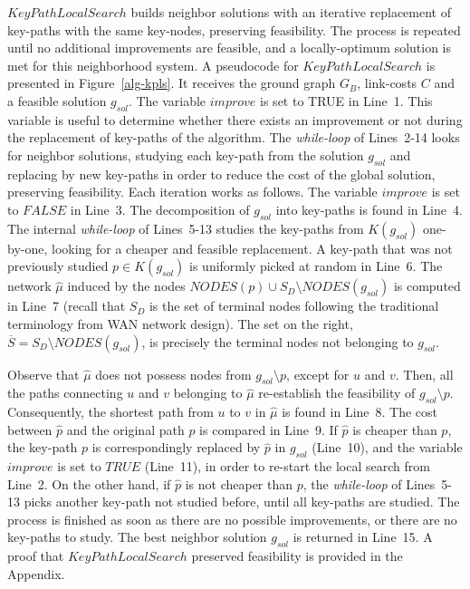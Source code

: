$KeyPathLocalSearch$ builds neighbor solutions with an iterative replacement of key-paths with 
the same key-nodes, preserving feasibility. The process is repeated until no additional improvements are feasible, and a locally-optimum solution is met for this neighborhood system. 
A pseudocode for $KeyPathLocalSearch$ is presented in Figure~\ref{alg-kpls}. 
It receives the ground graph $G_B$, link-costs $C$ and a feasible solution $g_{sol}$. 
The variable $improve$ is set to TRUE in Line~1. This variable is useful to determine whether there exists 
an improvement or not during the replacement of key-paths of the algorithm. The \textit{while-loop} 
of Lines~2-14 looks for neighbor solutions, studying each key-path from the solution $g_{sol}$ and 
replacing by new key-paths in order to reduce the cost of the global solution, preserving feasibility. 
Each iteration works as follows. The variable $improve$ is set to $FALSE$ in Line~3. The decomposition of $g_{sol}$ 
into key-paths is found in Line~4. The internal \textit{while-loop} of Lines~5-13 studies the key-paths from 
$K(g_{sol})$ one-by-one, looking for a cheaper and feasible replacement. A key-path that 
was not previously studied $p\in K (g_{sol})$ is uniformly picked at random in Line~6. 
The network $\hat{\mu}$ induced by the nodes $NODES(p) \cup S_D\setminus NODES(g_{sol})$ 
is computed in Line~7 (recall that $S_D$ is the set of terminal nodes following the traditional terminology from WAN network design). The set on the right, $\overline{S}=S_D\setminus NODES(g_{sol})$, is precisely the 
terminal nodes not belonging to $g_{sol}$.  

Observe that $\hat{\mu}$ does not possess nodes from $g_{sol}\setminus p$, except for $u$ and $v$. 
Then, all the paths connecting $u$ and $v$ belonging to $\hat{\mu}$ re-establish the feasibility of 
$g_{sol}\setminus p$. Consequently, the shortest path from $u$ to $v$ in $\hat{\mu}$ is found in Line~8. 
The cost between $\hat{p}$ and the original path $p$ is compared in Line~9. If $\hat{p}$ is cheaper than $p$, 
the key-path $p$ is correspondingly replaced by $\hat{p}$ in $g_{sol}$ (Line~10), and 
the variable $improve$ is set to $TRUE$ (Line~11), in order to re-start the local search from Line~2. On the other hand, if $\hat{p}$ is not cheaper than $p$, the \textit{while-loop} of Lines~5-13 picks another 
key-path not studied before, until all key-paths are studied. The process is finished as soon as there are 
no possible improvements, or there are no key-paths to study. 
The best neighbor solution $g_{sol}$ is returned in Line~15. A proof that $KeyPathLocalSearch$ preserved feasibility is provided in the Appendix.
 
